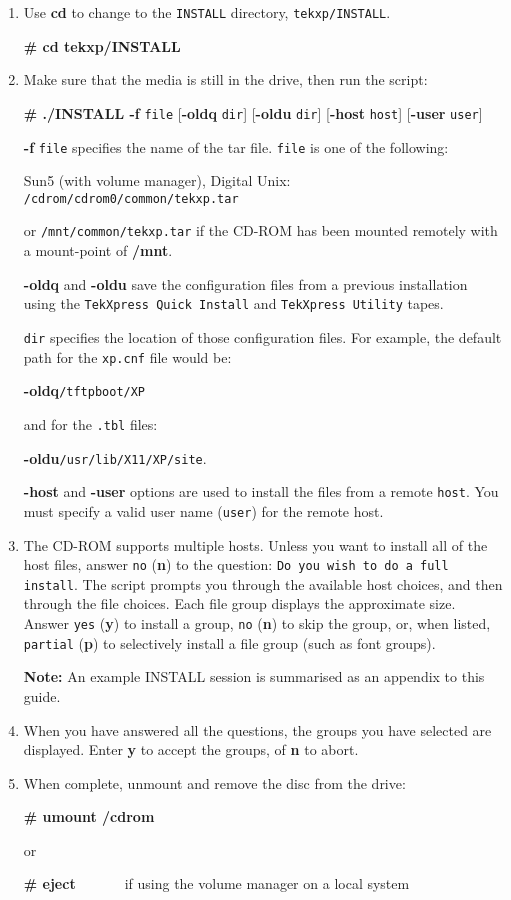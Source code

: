 \documentclass[11pt]{article}
\begin{document}
\begin {enumerate}

\item Use {\bf cd} to change to the {\tt INSTALL} directory,
{\tt tekxp/INSTALL}.

{\bf \# cd tekxp/INSTALL}

\item Make sure that the media is still in the drive, then run the script:

{\bf \# ./INSTALL -f} {\tt file} [{\bf -oldq} {\tt dir}] [{\bf -oldu} {\tt dir}]
[{\bf -host} {\tt host}] [{\bf -user} {\tt user}]

{\bf -f} {\tt file} specifies the name of the tar file. {\tt file} is one of the
following:

Sun5 (with volume manager), Digital Unix: {\tt /cdrom/cdrom0/common/tekxp.tar}

or {\tt /mnt/common/tekxp.tar} if the CD-ROM has been mounted remotely with a
mount-point of {\bf /mnt}.

{\bf -oldq} and {\bf -oldu} save the configuration files from a previous
installation using the {\tt TekXpress Quick Install} and {\tt TekXpress Utility}
tapes.

{\tt dir} specifies the location of those configuration files. For
example, the default path for the {\tt xp.cnf} file would be:

{\bf -oldq}{\tt /tftpboot/XP}

and for the {\tt .tbl} files:

{\bf -oldu}{\tt /usr/lib/X11/XP/site}.

{\bf -host} and {\bf -user} options are used to install the files from a remote
{\tt host}. You must specify a valid user name ({\tt user}) for the remote host.

\item The CD-ROM supports multiple hosts. Unless you want to install all of the
host files, answer {\tt no} ({\bf n}) to the question:
{\tt Do you wish to do a full install}. The script prompts you through the
available host choices, and then through the file choices. Each file group
displays the approximate size. Answer {\tt yes} ({\bf y}) to install a group,
{\tt no} ({\bf n}) to skip the group, or, when listed, {\tt partial} ({\bf p})
to selectively install a file group (such as font groups).

{\bf Note:} An example INSTALL session is summarised as an appendix to this
guide.

\item When you have answered all the questions, the groups you have selected
are displayed. Enter {\bf y} to accept the groups, of {\bf n} to abort.

\item When complete, unmount and remove the disc from the drive:

{\bf \# umount /cdrom}

or

{\bf \# eject}\ \ \ \ \ \ \ if using the volume manager on a local system

\end {enumerate}
\end{document}

